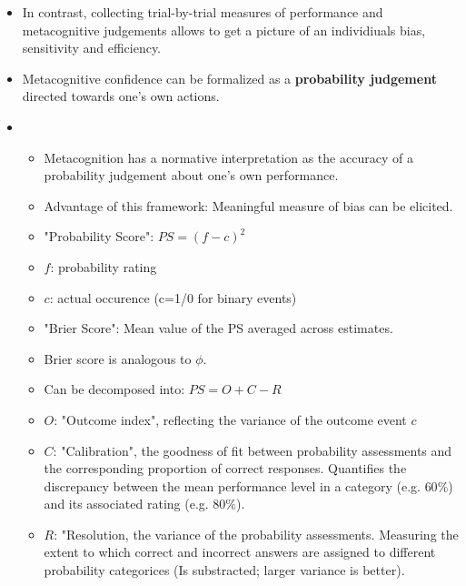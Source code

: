 \documentclass[../main/main.tex]{subfiles}
\begin{document}
\begin{itemize}
	\item In contrast, collecting trial-by-trial measures of performance and metacognitive judgements allows to get a picture of an individiuals bias, sensitivity and efficiency.
	\item Metacognitive confidence can be formalized as a \textbf{probability judgement} directed towards one's own actions.
	\item [] \begin{itemize}
			\item Metacognition has a normative interpretation as the accuracy of a probability judgement about one's own performance.
			\item Advantage of this framework: Meaningful measure of bias can be elicited.
			\item "Probability Score": $PS = (f - c)^2$
			\item $f$: probability rating
			\item $c$: actual occurence (c=1/0 for binary events)
			\item "Brier Score": Mean value of the PS averaged across estimates.
			\item Brier score is analogous to $\phi$.
			\item Can be decomposed into: $PS = O + C -R$
			\item $O$: "Outcome index", reflecting the variance of the outcome event $c$
			\item $C$: "Calibration", the goodness of fit between probability assessments and the corresponding proportion of correct responses. Quantifies the discrepancy between the mean performance level in a category (e.g. $60\%$) and its associated rating (e.g. $80\%$).
			\item $R$: "Resolution, the variance of the probability assessments. Measuring the extent to which correct and incorrect answers are assigned to different probability categorices (Is substracted; larger variance is better).
		\end{itemize}
	
\end{itemize}
\end{document}
